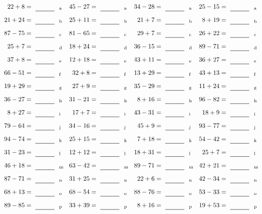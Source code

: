 \documentclass
[
  draft    = true,
  fontsize = 11pt,
  parskip  = half-
]
{scrartcl}
\begin{document}
\clearpage
\begin{align*}
    \pline{22+8}&=\rline{a}
  & \pline{45-27}&=\rline{a}
  & \pline{34-28}&=\rline{a}
  & \pline{25-15}&=\rline{a} \\[1ex]
    \pline{21+24}&=\rline{b}
  & \pline{25+11}&=\rline{b}
  & \pline{21+7}&=\rline{b}
  & \pline{8+19}&=\rline{b} \\[1ex]
    \pline{87-75}&=\rline{c}
  & \pline{81-65}&=\rline{c}
  & \pline{29+7}&=\rline{c}
  & \pline{26+22}&=\rline{c} \\[1ex]
    \pline{25+7}&=\rline{d}
  & \pline{18+24}&=\rline{d}
  & \pline{36-15}&=\rline{d}
  & \pline{89-71}&=\rline{d} \\[1ex]
    \pline{37+8}&=\rline{e}
  & \pline{12+18}&=\rline{e}
  & \pline{43+11}&=\rline{e}
  & \pline{36+27}&=\rline{e} \\[1ex]
    \pline{66-51}&=\rline{f}
  & \pline{32+8}&=\rline{f}
  & \pline{13+29}&=\rline{f}
  & \pline{43+13}&=\rline{f} \\[1ex]
    \pline{19+29}&=\rline{g}
  & \pline{27+9}&=\rline{g}
  & \pline{35-29}&=\rline{g}
  & \pline{11+24}&=\rline{g} \\[1ex]
    \pline{36-27}&=\rline{h}
  & \pline{31-21}&=\rline{h}
  & \pline{8+16}&=\rline{h}
  & \pline{96-82}&=\rline{h} \\[1ex]
    \pline{8+27}&=\rline{i}
  & \pline{17+7}&=\rline{i}
  & \pline{43-31}&=\rline{i}
  & \pline{18+9}&=\rline{i} \\[1ex]
    \pline{79-64}&=\rline{j}
  & \pline{34-16}&=\rline{j}
  & \pline{45+9}&=\rline{j}
  & \pline{93-77}&=\rline{j} \\[1ex]
    \pline{94-74}&=\rline{k}
  & \pline{25+15}&=\rline{k}
  & \pline{7+18}&=\rline{k}
  & \pline{54-42}&=\rline{k} \\[1ex]
    \pline{31-23}&=\rline{l}
  & \pline{12+12}&=\rline{l}
  & \pline{18+31}&=\rline{l}
  & \pline{25+7}&=\rline{l} \\[1ex]
    \pline{46+18}&=\rline{m}
  & \pline{63-42}&=\rline{m}
  & \pline{89-71}&=\rline{m}
  & \pline{42+21}&=\rline{m} \\[1ex]
    \pline{87-71}&=\rline{n}
  & \pline{31+25}&=\rline{n}
  & \pline{22+6}&=\rline{n}
  & \pline{42-34}&=\rline{n} \\[1ex]
    \pline{68+13}&=\rline{o}
  & \pline{68-54}&=\rline{o}
  & \pline{88-76}&=\rline{o}
  & \pline{53-33}&=\rline{o} \\[1ex]
    \pline{89-85}&=\rline{p}
  & \pline{33+39}&=\rline{p}
  & \pline{8+16}&=\rline{p}
  & \pline{19+53}&=\rline{p}
\end{align*}
\end{document}
